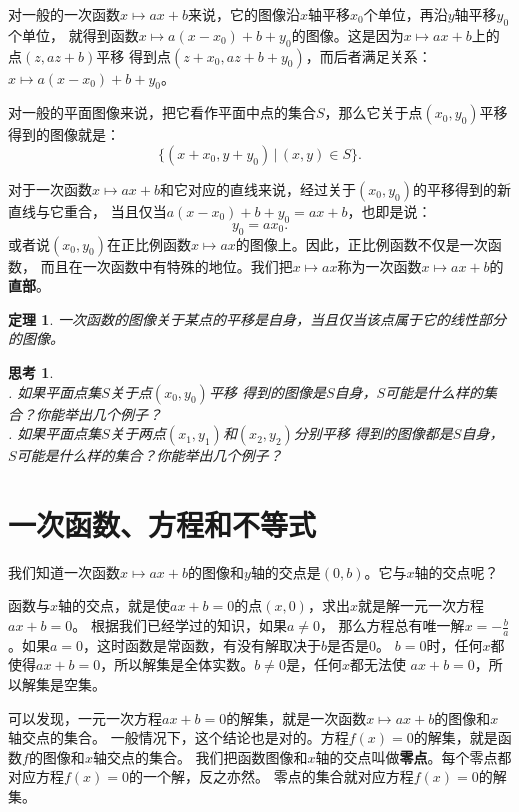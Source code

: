 \documentclass[12pt,UTF8]{ctexbook}
\newtheorem{tm}{定理}[section]
\newtheorem{sk}{思考}[section]
\begin{document}
对一般的一次函数$x\mapsto ax+b$来说，它的图像沿$x$轴平移$x_0$个单位，再沿$y$轴平移$y_0$个单位，
就得到函数$x\mapsto a(x-x_0)+b+y_0$的图像。这是因为$x\mapsto ax+b$上的点$(z, az+b)$平移
得到点$(z+x_0, az+b+y_0)$，而后者满足关系：$x\mapsto a(x-x_0)+b+y_0$。

对一般的平面图像来说，把它看作平面中点的集合$S$，那么它关于点$(x_0, y_0)$平移
得到的图像就是：
$$\{(x+x_0, y+y_0) \,|\, (x,y)\in S \}.$$

对于一次函数$x\mapsto ax+b$和它对应的直线来说，经过关于$(x_0, y_0)$的平移得到的新直线与它重合，
当且仅当$a(x-x_0)+b+y_0 = ax + b$，也即是说：
$$ y_0 = ax_0.$$
或者说$(x_0, y_0)$在正比例函数$x\mapsto ax$的图像上。因此，正比例函数不仅是一次函数，
而且在一次函数中有特殊的地位。我们把$x\mapsto ax$称为一次函数$x\mapsto ax+b$的\textbf{直部}。

\begin{tm}\label{tm:5-2-0}
    一次函数的图像关于某点的平移是自身，当且仅当该点属于它的线性部分的图像。
\end{tm}

\begin{sk}\label{sk:5-2-0}
    \mbox{}\\
    . 如果平面点集$S$关于点$(x_0, y_0)$平移
    得到的图像是$S$自身，$S$可能是什么样的集合？你能举出几个例子？ \\
    . 如果平面点集$S$关于两点$(x_1, y_1)$和$(x_2, y_2)$分别平移
    得到的图像都是$S$自身，$S$可能是什么样的集合？你能举出几个例子？
\end{sk}

\section{一次函数、方程和不等式}
我们知道一次函数$x\mapsto ax + b$的图像和$y$轴的交点是$(0, b)$。它与$x$轴的交点呢？

函数与$x$轴的交点，就是使$ax + b = 0$的点$(x, 0)$，求出$x$就是解一元一次方程$ax + b = 0$。
根据我们已经学过的知识，如果$a\neq 0$，
那么方程总有唯一解$x= -\frac{b}{a}$。如果$a = 0$，这时函数是常函数，有没有解取决于$b$是否是$0$。
$b = 0$时，任何$x$都使得$ax + b = 0$，所以解集是全体实数。$b \neq 0$是，任何$x$都无法使
$ax + b = 0$，所以解集是空集。

可以发现，一元一次方程$ax + b = 0$的解集，就是一次函数$x\mapsto ax + b$的图像和$x$轴交点的集合。
一般情况下，这个结论也是对的。方程$f(x) = 0$的解集，就是函数$f$的图像和$x$轴交点的集合。
我们把函数图像和$x$轴的交点叫做\textbf{零点}。每个零点都对应方程$f(x) = 0$的一个解，反之亦然。
零点的集合就对应方程$f(x) = 0$的解集。
\end{document}
